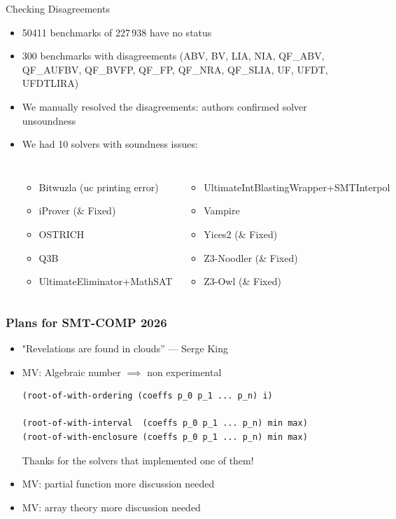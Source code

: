 \documentclass[table]{beamer}
\newcommand\vitem{\vfill\item}
\begin{document}
\begin{frame}{Checking Disagreements}

  \begin{itemize}
  \item  50411 benchmarks of 227\,938 have no status

  \vitem 300 benchmarks with disagreements (ABV,
  BV,
  LIA,
  NIA,
  QF\_ABV,
  QF\_AUFBV,
  QF\_BVFP,
  QF\_FP,
  QF\_NRA,
  QF\_SLIA,
  UF,
  UFDT,
  UFDTLIRA)

  \vitem We manually resolved the disagreements: authors confirmed solver
  unsoundness
  \vitem We had 10 solvers with soundness issues:
  \begin{columns}
    \begin{itemize}
      \item Bitwuzla (uc printing error)
      \item iProver (\& Fixed)
      \item OSTRICH
      \item Q3B
      \item UltimateEliminator+MathSAT
    \end{itemize}
    \begin{itemize}
      \item UltimateIntBlastingWrapper+SMTInterpol
      \item Vampire
      \item Yices2 (\& Fixed)
      \item Z3-Noodler (\& Fixed)
      \item Z3-Owl (\& Fixed)
    \end{itemize}
\end{columns}

  \end{itemize}
  \end{frame}

\begin{frame}[fragile]
  \frametitle{Plans for SMT-COMP 2026}
  \begin{itemize}
    \item "Revelations are found in clouds” --- Serge King
    \item MV: Algebraic number $\implies$ non experimental
\begin{verbatim}
(root-of-with-ordering (coeffs p_0 p_1 ... p_n) i)

(root-of-with-interval  (coeffs p_0 p_1 ... p_n) min max)
(root-of-with-enclosure (coeffs p_0 p_1 ... p_n) min max)
\end{verbatim}
    Thanks for the solvers that implemented one of them!
    \item MV: partial function more discussion needed
    \item MV: array theory more discussion needed
  \end{itemize}
\end{frame}
\end{document}
